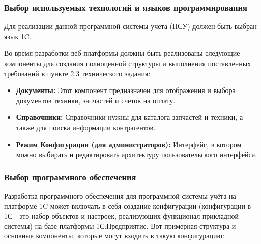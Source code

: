 \subsubsection{Выбор используемых технологий и языков программирования}

Для реализации данной программной системы учёта (ПСУ) должен быть выбран язык 1C.

Во время разработки веб-платформы должны быть реализованы следующие компоненты для создания полноценной структуры и выполнения поставленных требований в пункте 2.3 технического задания:
\begin{itemize}
	\item \textbf{Документы:} Этот компонент предназначен для отображения и выбора документов техники, запчастей и счетов на оплату.
	\item \textbf{Справочники:} Справочники нужны для каталога запчастей и техники, а также для поиска информации контрагентов. 
	\item \textbf{Режим Конфигурации (для администраторов):} Интерфейс, в котором можно выбирать и редактировать архитектуру пользовательского интерфейса.
\end{itemize}

\subsubsection{Выбор программного обеспечения}

Разработка программного обеспечения для программной системы учёта на платформе 1C может включать в себя создание конфигурации (конфигурации в 1С - это набор объектов и настроек, реализующих функционал прикладной системы) на базе платформы 1С:Предприятие. Вот примерная структура и основные компоненты, которые могут входить в такую конфигурацию:

